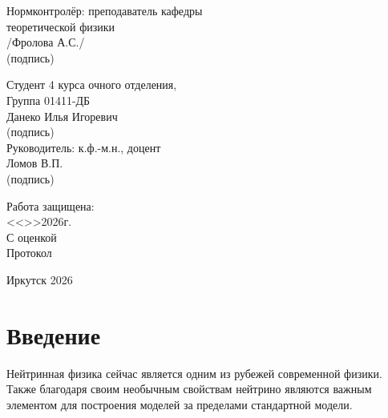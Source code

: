 \documentclass[a4paper,12pt]{article}
\begin{document}
\begin{titlepage}
	\begin{flushright}
		\begin{minipage}{100mm}
			Нормконтролёр: преподаватель кафедры\\
			теоретической физики\\
			\underline{\hspace{30mm}}/Фролова А.С./\\
			\hspace*{5mm}(подпись)
		\end{minipage}
		\begin{minipage}{70mm}
			Студент 4 курса очного отделения,\\
			Группа 01411-ДБ\\
			\underline{\hspace{25mm}}\;Данеко Илья Игоревич\\
			\hspace*{4mm}(подпись)\\
			Руководитель: к.ф.-м.н., доцент\\
			\underline{\hspace{30mm}}\;Ломов В.П.\\
			\hspace*{5mm}(подпись)
		\end{minipage}
	\end{flushright}
	\vspace*{2em}
	\begin{flushright}
		\begin{minipage}{70mm}
			Работа защищена:\\
			<<\underline{\hspace{8mm}}>>\underline{\hspace{22mm}}2026г.\\
			С оценкой \underline{\hspace{40mm}}\\
			Протокол \textnumero\underline{\hspace{20mm}}
		\end{minipage}
	\end{flushright}
	
	\vfill
	\begin{center}
		Иркутск 2026
	\end{center}
\end{titlepage}

\setcounter{page}{2}

\thispagestyle{empty}
\tableofcontents

\newpage

	\section*{Введение}
Нейтринная физика сейчас является одним из рубежей современной физики. Также благодаря своим необычным свойствам нейтрино являются важным элементом для построения моделей за пределами стандартной модели.
\end{document}
